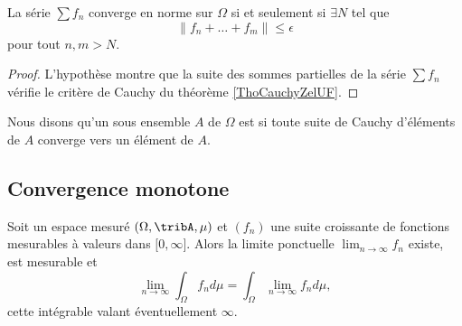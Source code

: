 \begin{corollary}       \label{CorCauchyCkXnvY}
    La série \( \sum f_n\) converge en norme sur \( \Omega\) si et seulement si \( \exists N\) tel que
    \begin{equation}
        \| f_n+\ldots+f_m \|\leq \epsilon
    \end{equation}
    pour tout \( n,m>N\).
\end{corollary}

\begin{proof}
    L'hypothèse montre que la suite des sommes partielles de la série \( \sum f_n\) vérifie le critère de Cauchy du théorème \ref{ThoCauchyZelUF}.
\end{proof}

\begin{definition}
    Nous disons qu'un sous ensemble \( A\) de \( \Omega\) est  si toute suite de Cauchy d'éléments de \( A\) converge vers un élément de \( A\).
\end{definition}

\subsection{Convergence monotone}

\begin{theorem} \label{ThoConvMonFtBoVh}
    Soit un espace mesuré \( (\Omega,\tribA,\mu)\) et \( (f_n)\) une suite croissante de fonctions mesurables à valeurs dans \( \mathopen[ 0 , \infty \mathclose]\). Alors la limite ponctuelle \( \lim_{n\to \infty} f_n\) existe, est mesurable et
    \begin{equation}    \label{EqFHqCmLV}
        \lim_{n\to \infty} \int_{\Omega}f_nd\mu= \int_{\Omega}\lim_{n\to \infty} f_nd\mu,
    \end{equation}
    cette intégrable valant éventuellement \( \infty\).
\end{theorem}

